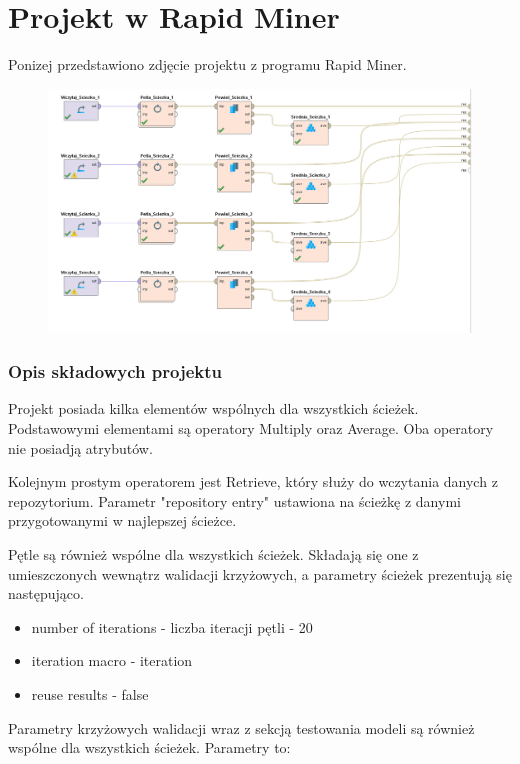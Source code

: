 \documentclass[12pt,oneside,a4paper]{book} %
\theoremstyle{break}
\begin{document}
\chapter*{Projekt w Rapid Miner}

Ponizej przedstawiono zdjęcie projektu z programu Rapid Miner.

\begin{figure}[H]
  \centering
  \includegraphics[width=1\textwidth]{project.png}
\end{figure}

\subsection*{Opis składowych projektu}

Projekt posiada kilka elementów wspólnych dla wszystkich ścieżek. Podstawowymi elementami są operatory Multiply oraz Average. Oba operatory nie posiadją atrybutów.

Kolejnym prostym operatorem jest Retrieve, który służy do wczytania danych z repozytorium. Parametr "repository entry" ustawiona na ścieżkę z danymi przygotowanymi w najlepszej ścieżce.

Pętle są również wspólne dla wszystkich ścieżek. Składają się one z umieszczonych wewnątrz walidacji krzyżowych, a parametry ścieżek prezentują się następująco.

\begin{itemize}
  \item number of iterations - liczba iteracji pętli - 20
  \item iteration macro - iteration
  \item reuse results - false
\end{itemize}

\newpage
Parametry krzyżowych walidacji wraz z sekcją testowania modeli są również wspólne dla wszystkich ścieżek. Parametry to:
\end{document}
